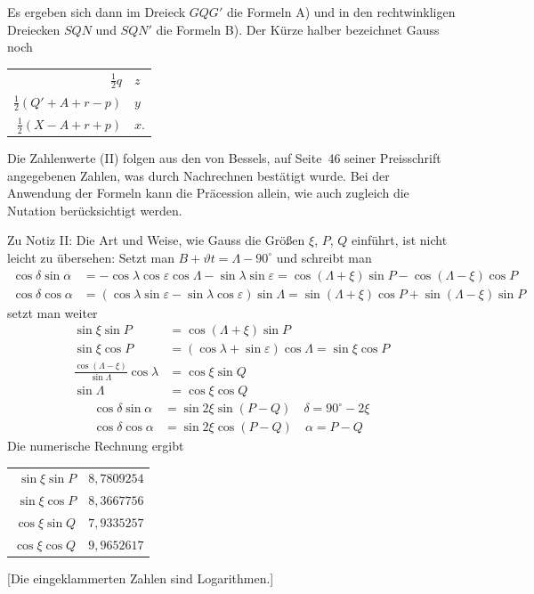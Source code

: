 \documentclass[12pt,a4paper]{article}
\theoremstyle{plain}
\theoremstyle{definition}
\theoremstyle{remark}
\begin{document}
Es ergeben sich dann im Dreieck $GQG'$ die Formeln A) und in den rechtwinkligen Dreiecken $SQN$ und $SQN'$ die Formeln B). Der K\"urze halber bezeichnet Gauss noch
\begin{center}
\begin{tabular}{r@{\ mit\ }l}
$\tfrac{1}{2}q$ & $z$ \\
$\tfrac{1}{2}(Q' + A + r - p)$ & $y$ \\
$\tfrac{1}{2}(X - A + r + p)$ & $x$.
\end{tabular}
\end{center}

Die Zahlenwerte (II) folgen aus den von Bessels, auf Seite~46 seiner Preisschrift angegebenen Zahlen, was durch Nachrechnen best\"atigt wurde. Bei der Anwendung der Formeln kann die Pr\"acession allein, wie auch zugleich die Nutation ber\"ucksichtigt werden.

Zu Notiz II: Die Art und Weise, wie Gauss die Gr\"o\ss en $\xi$, $P$, $Q$ einf\"uhrt, ist nicht leicht zu \"ubersehen: Setzt man $B + \vartheta t = \Lambda - 90^{\circ}$ und schreibt man
\begin{align*}
\cos\delta\sin\alpha &= -\cos\lambda\cos\varepsilon\cos\Lambda - \sin\lambda\sin\varepsilon = \cos(\Lambda + \xi)\sin P - \cos(\Lambda - \xi)\cos P \\
\cos\delta\cos\alpha &= (\cos\lambda\sin\varepsilon - \sin\lambda\cos\varepsilon)\sin\Lambda = \sin(\Lambda + \xi)\cos P + \sin(\Lambda - \xi)\sin P
\end{align*}
setzt man weiter
\begin{align*}
\sin\xi\sin P &= \cos(\Lambda + \xi)\sin P \\
\sin\xi\cos P &= (\cos\lambda + \sin\varepsilon)\cos\Lambda = \sin\xi\cos P \\
\tfrac{\cos(\Lambda - \xi)}{\sin\Lambda}\cos\lambda &= \cos\xi\sin Q \\
\sin\Lambda &= \cos\xi\cos Q
\end{align*}
\begin{align*}
\cos\delta\sin\alpha &= \sin 2\xi\sin(P - Q) \quad \delta = 90^{\circ} - 2\xi \\
\cos\delta\cos\alpha &= \sin 2\xi\cos(P - Q) \quad \alpha = P - Q
\end{align*}
Die numerische Rechnung ergibt
\begin{center}
\begin{tabular}{r@{\ $=$\ }r}
$\sin\xi\sin P$ & $8{,}7809254$ \\
$\sin\xi\cos P$ & $8{,}3667756$ \\
$\cos\xi\sin Q$ & $7{,}9335257$ \\
$\cos\xi\cos Q$ & $9{,}9652617$
\end{tabular}
\end{center}
[Die eingeklammerten Zahlen sind Logarithmen.]
\end{document}
